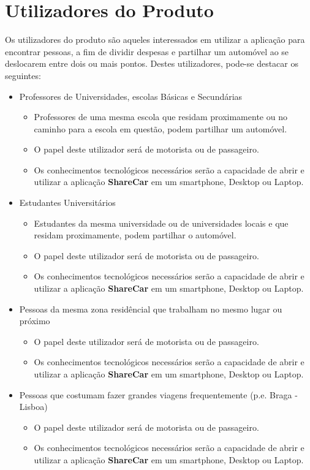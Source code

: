 \section{Utilizadores do Produto}
\hspace{5mm} Os utilizadores do produto são aqueles interessados em utilizar a aplicação para encontrar pessoas, a fim de dividir despesas e partilhar um automóvel ao se deslocarem entre dois ou mais pontos. Destes utilizadores, pode-se destacar os seguintes:

\begin{itemize}
        \item Professores de Universidades, escolas Básicas e Secundárias
        \begin{itemize}
            \item Professores de uma mesma escola que residam proximamente ou no caminho para a escola em questão, podem partilhar um automóvel.
            \item O papel deste utilizador será de motorista ou de passageiro.
            \item Os conhecimentos tecnológicos necessários serão a capacidade de abrir e utilizar a aplicação \textbf{ShareCar} em um smartphone, Desktop ou Laptop.
        \end{itemize}{}
        \item Estudantes Universitários
        \begin{itemize}
            \item Estudantes da mesma universidade ou de universidades locais e que residam proximamente, podem partilhar o automóvel.
            \item O papel deste utilizador será de motorista ou de passageiro.
            \item Os conhecimentos tecnológicos necessários serão a capacidade de abrir e utilizar a aplicação \textbf{ShareCar} em um smartphone, Desktop ou Laptop.
        \end{itemize}{}
        \item Pessoas da mesma zona residêncial que trabalham no mesmo lugar ou próximo
        \begin{itemize}
            \item O papel deste utilizador será de motorista ou de passageiro.
            \item Os conhecimentos tecnológicos necessários serão a capacidade de abrir e utilizar a aplicação \textbf{ShareCar} em um smartphone, Desktop ou Laptop.
        \end{itemize}{}
        \item Pessoas que costumam fazer grandes viagens frequentemente (p.e. Braga - Lisboa)\begin{itemize}
            \item O papel deste utilizador será de motorista ou de passageiro.
            \item Os conhecimentos tecnológicos necessários serão a capacidade de abrir e utilizar a aplicação \textbf{ShareCar} em um smartphone, Desktop ou Laptop.
        \end{itemize}{}
\end{itemize}{}

